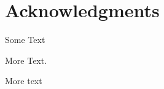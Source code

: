 

\bigskip


\begingroup

\let\clearpage\relax
\let\cleardoublepage\relax
\let\cleardoublepage\relax

\chapter*{Acknowledgments}

\noindent Some Text \\ \smallskip

\noindent More Text. \\ \smallskip

\noindent  More text

\endgroup
